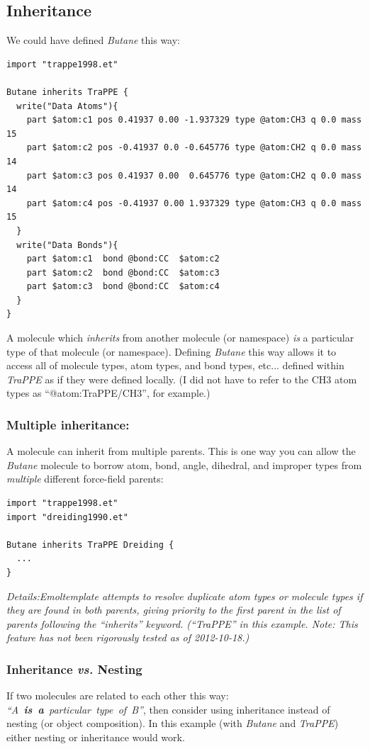 \documentclass[11pt]{article}
\begin{document}
\subsection{Inheritance}
\label{sec:inheritance}
We could have defined \textit{Butane} this way:
\begin{verbatim}
import "trappe1998.et"

Butane inherits TraPPE {
  write("Data Atoms"){
    part $atom:c1 pos 0.41937 0.00 -1.937329 type @atom:CH3 q 0.0 mass 15
    part $atom:c2 pos -0.41937 0.0 -0.645776 type @atom:CH2 q 0.0 mass 14
    part $atom:c3 pos 0.41937 0.00  0.645776 type @atom:CH2 q 0.0 mass 14
    part $atom:c4 pos -0.41937 0.00 1.937329 type @atom:CH3 q 0.0 mass 15
  }
  write("Data Bonds"){
    part $atom:c1  bond @bond:CC  $atom:c2
    part $atom:c2  bond @bond:CC  $atom:c3
    part $atom:c3  bond @bond:CC  $atom:c4
  }
}
\end{verbatim}
A molecule which \textit{inherits} from another molecule (or namespace)
\textit{is} a particular type of that molecule (or namespace).
Defining \textit{Butane} this way allows it to 
access all of molecule types, atom types, and bond types, etc...
defined within \textit{TraPPE} as if they were defined locally.
(I did not have to refer to the CH3 atom types as ``@atom:TraPPE/CH3'',
 for example.)

\subsubsection{Multiple inheritance:}
\label{sec:multiple_inheritance}
A molecule can inherit from multiple parents.
This is one way you can allow the \textit{Butane} molecule
to borrow atom, bond, angle, dihedral, and improper types from
\textit{multiple} different force-field parents:
\begin{verbatim}
import "trappe1998.et"
import "dreiding1990.et"

Butane inherits TraPPE Dreiding {
  ...
}
\end{verbatim}
\textit{Details:Emoltemplate attempts to resolve duplicate atom types or 
molecule types if they are found in both parents, giving priority to the 
first parent in the list of parents following the ``inherits'' keyword. 
(``TraPPE'' in this example.
Note: This feature has not been rigorously tested as of 2012-10-18.)}

\subsubsection{Inheritance \textit{vs.} Nesting}
\label{sec:inheritance_vs_nesting}
If two molecules are related to each other this way:
\mbox{\textit{``A \textbf{is a} particular type of B''}},
then consider using inheritance instead of nesting
(or object composition).
In this example (with \textit{Butane} and \textit{TraPPE})
either nesting or inheritance would work.
\end{document}
